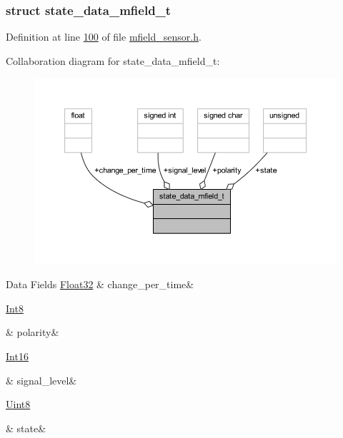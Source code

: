 \subsubsection{struct state\+\_\+data\+\_\+mfield\+\_\+t}


Definition at line \hyperlink{a00019_source_l00100}{100} of file \hyperlink{a00019_source}{mfield\+\_\+sensor.\+h}.



Collaboration diagram for state\+\_\+data\+\_\+mfield\+\_\+t\+:\nopagebreak
\begin{figure}[H]
\begin{center}
\leavevmode
\includegraphics[width=350pt]{de/d49/a00952}
\end{center}
\end{figure}
\begin{DoxyFields}{Data Fields}
\hypertarget{a00019_a0f645dd76b41adc6a966feba8e4bff8c}{\hyperlink{a00072_a87d38f886e617ced2698fc55afa07637}{Float32}}\label{a00019_a0f645dd76b41adc6a966feba8e4bff8c}
&
change\+\_\+per\+\_\+time&
\\
\hline

\hypertarget{a00019_a45152a3cd909463d7c924c30b575a073}{\hyperlink{a00072_a7e31ca7716b8d85dd473450a5c5e5a97}{Int8}}\label{a00019_a45152a3cd909463d7c924c30b575a073}
&
polarity&
\\
\hline

\hypertarget{a00019_a4070db8eab0ff93e3fbc1df59872f117}{\hyperlink{a00072_a659ce9e5eb6571f9984ffc7caad2660a}{Int16}}\label{a00019_a4070db8eab0ff93e3fbc1df59872f117}
&
signal\+\_\+level&
\\
\hline

\hypertarget{a00019_a6b8d8e916bc56265a3fd279bd26b6d1b}{\hyperlink{a00072_af84840501dec18061d18a68c162a8fa2}{Uint8}}\label{a00019_a6b8d8e916bc56265a3fd279bd26b6d1b}
&
state&
\\
\hline

\end{DoxyFields}
\label{d6/db2/a00601}
\hypertarget{a00019_d6/db2/a00601}{}
